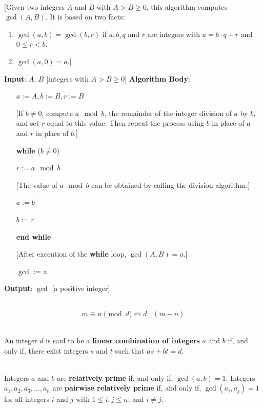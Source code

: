 \documentclass[12pt]{article}
\begin{document}
\begin{algorithm}
\hfill\\
$[$Given two integers $A$ and $B$ with $A > B \geq 0$, this algorithm computes $\gcd(A, B)$. It is
based on two facts:
\begin{enumerate}
\item  $\gcd(a, b) = \gcd(b,r)$ if $a, b, q$ and $r$ are integers with $a = b\cdot q + r$ and $0 \leq r < b$.
\item  $\gcd(a, 0) = a.]$
\end{enumerate}
\textbf{Input}: $A$, $B$ [integers with $A > B \geq 0$]
\textbf{Algorithm Body}:
\begin{itemize}
\item[] $a := A, b := B,r := B$
\item[] [If $b \neq 0$, compute $a \mod b$, the remainder of the integer division of $a$ by $b$, and set $r$ equal to this value. Then repeat the process using $b$ in place of $a$ and $r$ in place of $b$.]
\item[] \textbf{while} ($b\neq 0$)
\item[] \hspace{5em}$r := a \mod b$
\item[] [The value of $a \mod b$ can be obtained by calling the division algorithm.]
\item[] \hspace{5em}$a := b$
\item[] \hspace{5em}$b := r$
\item[] \textbf{end while}
\item[] [After execution of the \textbf{while} loop, $\gcd(A, B) = a$.]
\item[] $\gcd$ := a
\end{itemize}
\textbf{Output}: $\gcd$ [a positive integer]
\end{algorithm}
\begin{definition}[Modulo]
\hfill\\
\[m \equiv n \pmod{ d} \Leftrightarrow d \mid (m - n)\]
\end{definition}
\begin{definition}
\hfill\\
\normalfont An integer $d$ is said to be a \textbf{linear combination of integers} $a$ and $b$ if, and only if,
there exist integers $s$ and $t$ such that $as + bt = d$.
\end{definition}
\begin{definition}[Coprime]
\hfill\\
\normalfont Integers $a$ and $b$ are \textbf{relatively prime} if, and only if, $\gcd(a, b) = 1$. Integers $a_1, a_2,
a_3,\ldots, a_n$ are \textbf{pairwise relatively prime} if, and only if, $\gcd(a_i, a_j) = 1$ for all integers
$i$ and $j$ with $1 \leq i, j \leq n$, and $i \neq j$.
\end{definition}
\end{document}
